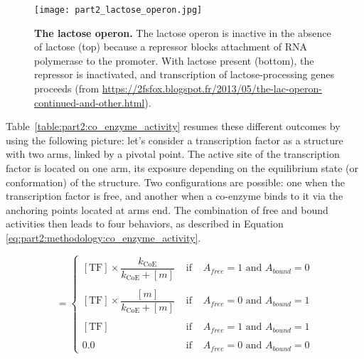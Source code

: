 \begin{figure}[!h]
\centering 
\texttt{[image: part2\_lactose\_operon.jpg]}
\caption[The lactose operon.]{\textbf{The lactose operon.} The lactose operon is inactive in the absence of lactose (top) because a repressor blocks attachment of RNA polymerase to the promoter. With lactose present (bottom), the repressor is inactivated, and transcription of lactose-processing genes proceeds (from \href{https://2fsfox.blogspot.fr/2013/05/the-lac-operon-continued-and-other.html}{https://2fsfox.blogspot.fr/2013/05/the-lac-operon-continued-and-other.html}).}
\label{fig:part2:methodology:lactose_operon}
\end{figure}

Table~\ref{table:part2:co_enzyme_activity} resumes these different outcomes by using the following picture: let's consider a transcription factor as a structure with two arms, linked by a pivotal point. The active site of the transcription factor is located on one arm, its exposure depending on the equilibrium state (or conformation) of the structure. Two configurations are possible: one when the transcription factor is free, and another when a co-enzyme binds to it via the anchoring points located at arms end. The combination of free and bound activities then leads to four behaviors, as described in Equation \ref{eq:part2:methodology:co_enzyme_activity}.

\begin{equation}
[\text{TF}_+] = 
\left\{
\begin{array}{ccl}
\left[\text{TF}\right] \times \dfrac{k_\text{CoE}}{k_\text{CoE}+[m]} & \text{ if } & A_{free}=1 \text{ and } A_{bound}=0\\\\
\left[\text{TF}\right] \times \dfrac{[m]}{k_\text{CoE}+[m]} & \text{ if } & A_{free}=0 \text{ and } A_{bound}=1\\\\
\left[\text{TF}\right] & \text{ if } & A_{free}=1 \text{ and } A_{bound}=1\\\\
0.0 & \text{ if } & A_{free}=0 \text{ and } A_{bound}=0
\end{array}
\right.
\label{eq:part2:methodology:co_enzyme_activity}
\end{equation}






